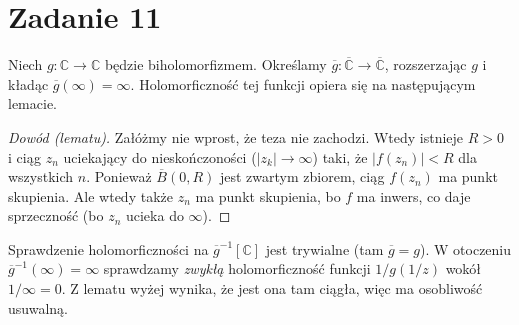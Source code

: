 \section*{Zadanie 11}

Niech \( g: \mathbb{C} \to \mathbb{C} \) będzie biholomorfizmem. Określamy \( \overline{g}: \overline{ \mathbb{C} } \to \overline{ \mathbb{C} } \), rozszerzając \( g \) i kładąc \( \overline{g}(\infty) = \infty \). Holomorficzność tej funkcji opiera się na następującym lemacie.


\begin{proof}[Dowód (lematu)]
    Załóżmy nie wprost, że teza nie zachodzi. Wtedy istnieje \( R > 0 \) i ciąg \( z_n \) uciekający do nieskończoności (\( \left| z_k \right| \to \infty  \)) taki, że \( \left| f(z_n) \right| < R \) dla wszystkich \( n \). Ponieważ \( \overline{B}(0, R) \) jest zwartym zbiorem, ciąg \( f(z_n) \) ma punkt skupienia. Ale wtedy także \( z_n \) ma punkt skupienia, bo \( f \) ma inwers, co daje sprzeczność (bo \( z_n \) ucieka do \( \infty \)).
\end{proof}

Sprawdzenie holomorficzności na \( \overline{g}^{-1}[ \mathbb{C} ] \) jest trywialne (tam \( \overline{g} = g \)). W otoczeniu \( \overline{g}^{-1}(\infty) = \infty \) sprawdzamy \textit{zwykłą} holomorficzność funkcji \( 1/g(1/z) \) wokół \( 1/\infty = 0 \). Z lematu wyżej wynika, że jest ona tam ciągła, więc ma osobliwość usuwalną.
